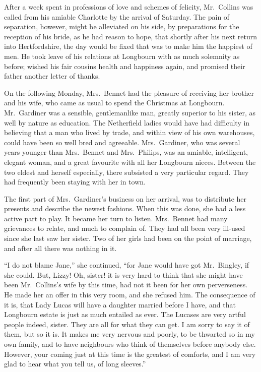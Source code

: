 
After a week spent in professions of love and schemes
of felicity, Mr.\ Collins was called from his amiable Charlotte
by the arrival of Saturday. The pain of separation,
however, might be alleviated on his side, by preparations
for the reception of his bride, as he had reason to hope,
that shortly after his next return into Hertfordshire, the
day would be fixed that was to make him the happiest
of men. He took leave of his relations at Longbourn
with as much solemnity as before; wished his fair cousins
health and happiness again, and promised their father
another letter of thanks.

On the following Monday, Mrs.\ Bennet had the pleasure
of receiving her brother and his wife, who came as usual
to spend the Christmas at Longbourn. Mr.\ Gardiner was
a sensible, gentlemanlike man, greatly superior to his
sister, as well by nature as education. The Netherfield
ladies would have had difficulty in believing that a man
who lived by trade, and within view of his own warehouses,
could have been so well bred and agreeable. Mrs.\ Gardiner,
who was several years younger than Mrs.\ Bennet and
Mrs.\ Philips, was an amiable, intelligent, elegant woman,
and a great favourite with all her Longbourn nieces.
Between the two eldest and herself especially, there subsisted
a very particular regard. They had frequently
been staying with her in town.

The first part of Mrs.\ Gardiner’s business on her arrival,
was to distribute her presents and describe the newest
fashions. When this was done, she had a less active part
to play. It became her turn to listen. Mrs.\ Bennet had
many grievances to relate, and much to complain of.
They had all been very ill-used since she last saw her
sister. Two of her girls had been on the point of marriage,
and after all there was nothing in it.

“I do not blame Jane,” she continued, “for Jane
would have got Mr.\ Bingley, if she could. But, Lizzy!
Oh, sister! it is very hard to think that she might have
been Mr.\ Collins’s wife by this time, had not it been for
her own perverseness. He made her an offer in this very
room, and she refused him. The consequence of it is,
that Lady Lucas will have a daughter married before I
have, and that Longbourn estate is just as much entailed
as ever. The Lucases are very artful people indeed, sister.
They are all for what they can get. I am sorry to say
it of them, but so it is. It makes me very nervous and
poorly, to be thwarted so in my own family, and to have
neighbours who think of themselves before anybody else.
However, your coming just at this time is the greatest
of comforts, and I am very glad to hear what you tell
us, of long sleeves.”

